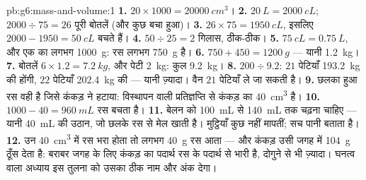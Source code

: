 \begin{solution}{pb:g6:mass-and-volume:1}
\textbf{1.} $20 \times 1000 = \qty{20000}{cm^3}$।
\textbf{2.} $\qty{20}{L} = \qty{2000}{cL}$; $2000 \div 75 = 26$
पूरी बोतलें (और कुछ बचा हुआ)।
\textbf{3.} $26 \times 75 = \qty{1950}{cL}$, इसलिए $2000 - 1950 =
\qty{50}{cL}$ बचते हैं।
\textbf{4.} $50 \div 25 = 2$ गिलास, ठीक-ठीक।
\textbf{5.} $\qty{75}{cL} = \qty{0.75}{L}$, और एक  का  लगभग
\qty{1000}{g}: रस लगभग \qty{750}{g} है।
\textbf{6.} $750 + 450 = \qty{1200}{g}$ --- यानी \qty{1.2}{kg}।
\textbf{7.} बोतलें $6 \times 1.2 = \qty{7.2}{kg}$, और पेटी
\qty{2}{kg}: कुल \qty{9.2}{kg}।
\textbf{8.} $200 \div 9.2$: $21$ पेटियाँ \qty{193.2}{kg} की होंगी,
$22$ पेटियाँ \qty{202.4}{kg} की --- यानी ज़्यादा। वैन $21$ पेटियाँ
ले जा सकती है।
\textbf{9.} छलका हुआ रस वही है जिसे कंकड़ ने हटाया: विस्थापन वाली
प्रतिज्ञप्ति से कंकड़ का  \qty{40}{cm^3} है।
\textbf{10.} $1000 - 40 = \qty{960}{mL}$ रस बचता है।
\textbf{11.} बेलन को \qty{100}{mL} से \qty{140}{mL} तक चढ़ना चाहिए
--- यानी \qty{40}{mL} की उठान, जो छलके रस से मेल खाती है। मुट्ठियाँ
कुछ नहीं मापतीं; सच पानी बताता है।
\textbf{12.} उन \qty{40}{cm^3} में रस भरा होता तो लगभग \qty{40}{g}
रस आता --- और कंकड़ उसी जगह में \qty{104}{g} ठूँस देता है: बराबर जगह
के लिए कंकड़ का पदार्थ रस के पदार्थ से भारी है, दोगुने से भी ज़्यादा।
घनत्व वाला अध्याय इस तुलना को उसका ठीक नाम और अंक देगा।
\end{solution}
